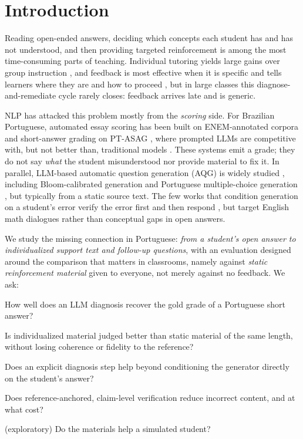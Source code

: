 \documentclass[11pt]{article}
\begin{document}
\section{Introduction}

Reading open-ended answers, deciding which concepts each student has and has not understood, and then providing targeted reinforcement is among the most time-consuming parts of teaching. Individual tutoring yields large gains over group instruction \citep{bloom1984}, and feedback is most effective when it is specific and tells learners where they are and how to proceed \citep{hattie2007}, but in large classes this diagnose-and-remediate cycle rarely closes: feedback arrives late and is generic.

NLP has attacked this problem mostly from the \emph{scoring} side. For Brazilian Portuguese, automated essay scoring has been built on ENEM-annotated corpora \citep{marinho2022,chalegre2026} and short-answer grading on PT-ASAG \citep{galhardi2018}, where prompted LLMs are competitive with, but not better than, traditional models \citep{mello2025}. These systems emit a grade; they do not say \emph{what} the student misunderstood nor provide material to fix it. In parallel, LLM-based automatic question generation (AQG) is widely studied \citep{oliveira2026}, including Bloom-calibrated generation \citep{scaria2024} and Portuguese multiple-choice generation \citep{mucciaccia2025}, but typically from a static source text. The few works that condition generation on a student's error verify the error first and then respond \citep{daheim2024}, but target English math dialogues rather than conceptual gaps in open answers.

We study the missing connection in Portuguese: \emph{from a student's open answer to individualized support text and follow-up questions}, with an evaluation designed around the comparison that matters in classrooms, namely against \emph{static reinforcement material} given to everyone, not merely against no feedback. We ask:
\begin{description}\itemsep0pt
  \item[RQ1] How well does an LLM diagnosis recover the gold grade of a Portuguese short answer?
  \item[RQ2] Is individualized material judged better than static material of the same length, without losing coherence or fidelity to the reference?
  \item[RQ3] Does an explicit diagnosis step help beyond conditioning the generator directly on the student's answer?
  \item[RQ4] Does reference-anchored, claim-level verification reduce incorrect content, and at what cost?
  \item[RQ5] (exploratory) Do the materials help a simulated student?
\end{description}
\end{document}
